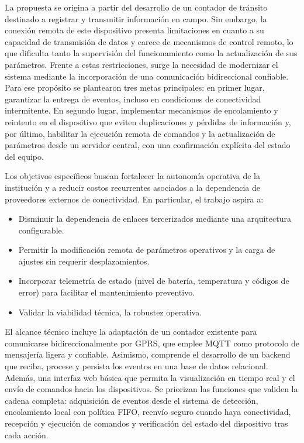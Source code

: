 La propuesta se origina a partir del desarrollo de un contador de tránsito destinado a registrar y transmitir información en campo. Sin embargo, la conexión remota de este dispositivo presenta limitaciones en cuanto a su capacidad de transmisión de datos y carece de mecanismos de control remoto, lo que dificulta tanto la supervisión del funcionamiento como la actualización de sus parámetros. Frente a estas restricciones, surge la necesidad de modernizar el sistema mediante la incorporación de una comunicación bidireccional confiable. Para ese propósito se plantearon tres metas principales: en primer lugar, garantizar la entrega de eventos, incluso en condiciones de conectividad intermitente. En segundo lugar, implementar mecanismos de encolamiento y reintento en el dispositivo que eviten duplicaciones y pérdidas de información y, por último, habilitar la ejecución remota de comandos y la actualización de parámetros desde un servidor central, con una confirmación explícita del estado del equipo.

Los objetivos específicos buscan fortalecer la autonomía operativa de la institución y a reducir costos recurrentes asociados a la dependencia de proveedores externos de conectividad. En particular, el trabajo aspira a: 
\begin{itemize}
\item Disminuir la dependencia de enlaces tercerizados mediante una arquitectura configurable.

\item Permitir la modificación remota de parámetros operativos y la carga de ajustes sin requerir desplazamientos. 

\item Incorporar telemetría de estado (nivel de batería, temperatura y códigos de error) para facilitar el mantenimiento preventivo.

\item Validar la viabilidad técnica, la robustez operativa.
\end{itemize}

El alcance técnico incluye la adaptación de un contador existente para comunicarse bidireccionalmente por GPRS, que emplee MQTT como protocolo de mensajería ligera y confiable. Asimismo, comprende el desarrollo de un backend que reciba, procese y persista los eventos en una base de datos relacional. Además, una interfaz web básica que permita la visualización en tiempo real y el envío de comandos hacia los dispositivos. Se priorizan las funciones que validen la cadena completa: adquisición de eventos desde el sistema de detección, encolamiento local con política FIFO, reenvío seguro cuando haya conectividad, recepción y ejecución de comandos y verificación del estado del dispositivo tras cada acción.

